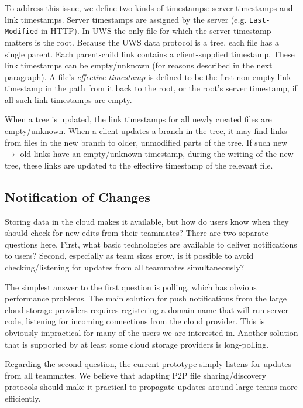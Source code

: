 \documentclass[runningheads]{llncs}
\begin{document}
To address this issue, we define two kinds of timestamps: server timestamps and link timestamps.
Server timestamps are assigned by the server (e.g. \texttt{Last- Modified} in HTTP).
In UWS the only file for which the server timestamp matters is the root.
Because the UWS data protocol is a tree, each file has a single parent.
Each parent-child link contains a client-supplied timestamp.
These link timestamps can be empty{\slash}unknown (for reasons described in the next paragraph).
A file's \emph{effective timestamp} is defined to be the first non-empty link timestamp in the path from it back to the root, or the root's server timestamp, if all such link timestamps are empty.

When a tree is updated, the link timestamps for all newly created files are empty{\slash}unknown.
When a client updates a branch in the tree, it may find links from files in the new branch to older, unmodified parts of the tree.
If such new $\rightarrow$ old links have an empty{\slash}unknown timestamp, during the writing of the new tree, these links are updated to the effective timestamp of the relevant file.

\subsection{Notification of Changes}

Storing data in the cloud makes it available, but how do users know when they should check for new edits from their teammates?
There are two separate questions here.
First, what basic technologies are available to deliver notifications to users?
Second, especially as team sizes grow, is it possible to avoid checking{\slash}listening for updates from all teammates simultaneously?

The simplest answer to the first question is polling, which has obvious performance problems.
The main solution for push notifications from the large cloud storage providers requires registering a domain name that will run server code, listening for incoming connections from the cloud provider.
This is obviously impractical for many of the users we are interested in.
Another solution that is supported by at least some cloud storage providers is long-polling.

Regarding the second question, the current prototype simply listens for updates from all teammates.
We believe that adapting P2P file sharing{\slash}discovery protocols should make it practical to propagate updates around large teams more efficiently.
\end{document}
